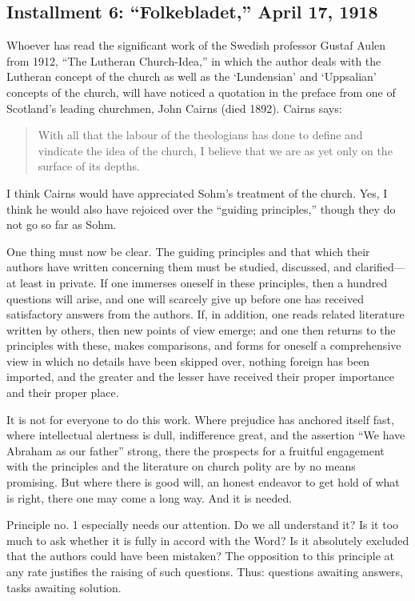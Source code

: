 

\subsection{Installment 6: “Folkebladet,” April 17, 1918}

Whoever has read the significant work of the Swedish professor Gustaf Aulen from 1912, “The Lutheran Church-Idea,” in which the author deals with the Lutheran concept of the church as well as the ‘Lundensian’ and ‘Uppsalian’ concepts of the church, will have noticed a quotation in the preface from one of Scotland’s leading churchmen, John Cairns (died 1892). Cairns says:

\begin{quote}
With all that the labour of the theologians has done
to define and vindicate the idea of the church, I believe
that we are as yet only on the surface of its depths.
\end{quote}

I think Cairns would have appreciated Sohm’s treatment of the church. Yes, I think he would also have rejoiced over the “guiding principles,” though they do not go so far as Sohm.

One thing must now be clear. The guiding principles and that which their authors have written concerning them must be studied, discussed, and clarified—at least in private. If one immerses oneself in these principles, then a hundred questions will arise, and one will scarcely give up before one has received satisfactory answers from the authors. If, in addition, one reads related literature written by others, then new points of view emerge; and one then returns to the principles with these, makes comparisons, and forms for oneself a comprehensive view in which no details have been skipped over, nothing foreign has been imported, and the greater and the lesser have received their proper importance and their proper place.

It is not for everyone to do this work. Where prejudice has anchored itself fast, where intellectual alertness is dull, indifference great, and the assertion “We have Abraham as our father” strong, there the prospects for a fruitful engagement with the principles and the literature on church polity are by no means promising. But where there is good will, an honest endeavor to get hold of what is right, there one may come a long way. And it is needed.

Principle no. 1 especially needs our attention. Do we all understand it? Is it too much to ask whether it is fully in accord with the Word? Is it absolutely excluded that the authors could have been mistaken? The opposition to this principle at any rate justifies the raising of such questions. Thus: questions awaiting answers, tasks awaiting solution.

